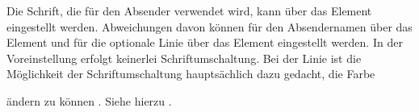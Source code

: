 \BeginIndexGroup
{}%
%
%
Die Schrift, die für den Absender verwendet wird, kann über das Element
%
 eingestellt werden. Abweichungen davon
können für den Absendernamen über das Element
%
 und für die %
\iffalse%
mit \Option{fromrule} gesetzte %
\else %
optionale %
\fi%
Linie über das Element %
 eingestellt werden. In der Voreinstellung
erfolgt keinerlei Schriftumschaltung. Bei der Linie ist die Möglichkeit der
Schriftumschaltung hauptsächlich dazu gedacht, die Farbe %
\iffalse %
der Linie %
\fi
ändern zu können%
\iffalse%
, um etwa Grau anstelle von Schwarz zu verwenden%
\fi%
. Siehe hierzu \cite{package:xcolor}.%
%
\EndIndexGroup
%
